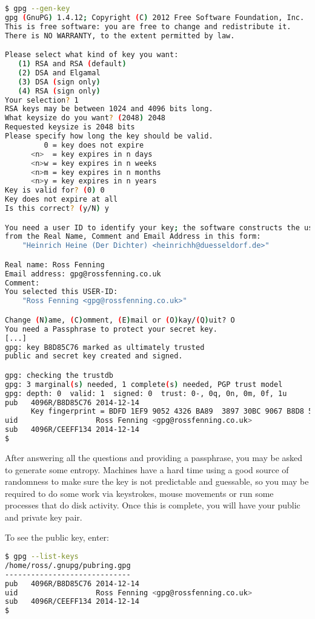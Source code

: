 \documentclass{report}
\begin{document}
\begin{lstlisting}[language=bash]
$ gpg --gen-key
gpg (GnuPG) 1.4.12; Copyright (C) 2012 Free Software Foundation, Inc.
This is free software: you are free to change and redistribute it.
There is NO WARRANTY, to the extent permitted by law.

Please select what kind of key you want:
   (1) RSA and RSA (default)
   (2) DSA and Elgamal
   (3) DSA (sign only)
   (4) RSA (sign only)
Your selection? 1
RSA keys may be between 1024 and 4096 bits long.
What keysize do you want? (2048) 2048
Requested keysize is 2048 bits
Please specify how long the key should be valid.
         0 = key does not expire
      <n>  = key expires in n days
      <n>w = key expires in n weeks
      <n>m = key expires in n months
      <n>y = key expires in n years
Key is valid for? (0) 0
Key does not expire at all
Is this correct? (y/N) y

You need a user ID to identify your key; the software constructs the user ID
from the Real Name, Comment and Email Address in this form:
    "Heinrich Heine (Der Dichter) <heinrichh@duesseldorf.de>"

Real name: Ross Fenning
Email address: gpg@rossfenning.co.uk
Comment:
You selected this USER-ID:
    "Ross Fenning <gpg@rossfenning.co.uk>"

Change (N)ame, (C)omment, (E)mail or (O)kay/(Q)uit? O
You need a Passphrase to protect your secret key.
[...]
gpg: key B8D85C76 marked as ultimately trusted
public and secret key created and signed.

gpg: checking the trustdb
gpg: 3 marginal(s) needed, 1 complete(s) needed, PGP trust model
gpg: depth: 0  valid: 1  signed: 0  trust: 0-, 0q, 0n, 0m, 0f, 1u
pub   4096R/B8D85C76 2014-12-14
      Key fingerprint = BDFD 1EF9 9052 4326 BA89  3897 30BC 9067 B8D8 5C76
uid                  Ross Fenning <gpg@rossfenning.co.uk>
sub   4096R/CEEFF134 2014-12-14
$
\end{lstlisting}

After answering all the questions and providing a passphrase,
you may be asked to generate some entropy.
Machines have a hard time using a good source of randomness to make sure
the key is not predictable and guessable, so you may be required to do
some work via keystrokes, mouse movements or run some processes that
do disk activity. Once this is complete, you will have your public and
private key pair.

To see the public key, enter:

\begin{lstlisting}[language=bash]
$ gpg --list-keys
/home/ross/.gnupg/pubring.gpg
-----------------------------
pub   4096R/B8D85C76 2014-12-14
uid                  Ross Fenning <gpg@rossfenning.co.uk>
sub   4096R/CEEFF134 2014-12-14
$
\end{lstlisting}
\end{document}
